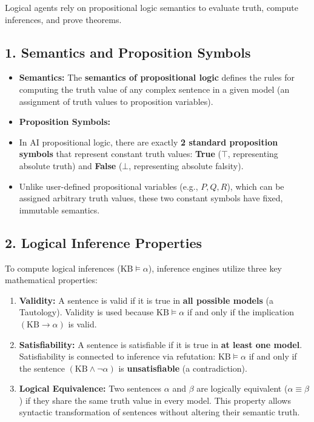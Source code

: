 Logical agents rely on propositional logic semantics to evaluate truth, compute inferences, and prove theorems.


\subsection{1. Semantics and Proposition Symbols}
\begin{itemize}
  \item   \textbf{Semantics:} The \textbf{semantics of propositional logic} defines the rules for computing the truth value of any complex sentence in a given model (an assignment of truth values to proposition variables).
  \item   \textbf{Proposition Symbols:}
  \item   In AI propositional logic, there are exactly \textbf{2 standard proposition symbols} that represent constant truth values: \textbf{True} ($\top$, representing absolute truth) and \textbf{False} ($\bot$, representing absolute falsity).
  \item   Unlike user-defined propositional variables (e.g., $P, Q, R$), which can be assigned arbitrary truth values, these two constant symbols have fixed, immutable semantics.
\end{itemize}

\subsection{2. Logical Inference Properties}
To compute logical inferences ($\text{KB} \models \alpha$), inference engines utilize three key mathematical properties:
\begin{enumerate}
  \item \textbf{Validity:} A sentence is valid if it is true in \textbf{all possible models} (a Tautology). Validity is used because $\text{KB} \models \alpha$ if and only if the implication $(\text{KB} \rightarrow \alpha)$ is valid.
  \item \textbf{Satisfiability:} A sentence is satisfiable if it is true in \textbf{at least one model}. Satisfiability is connected to inference via refutation: $\text{KB} \models \alpha$ if and only if the sentence $(\text{KB} \land \neg \alpha)$ is \textbf{unsatisfiable} (a contradiction).
  \item \textbf{Logical Equivalence:} Two sentences $\alpha$ and $\beta$ are logically equivalent ($\alpha \equiv \beta$) if they share the same truth value in every model. This property allows syntactic transformation of sentences without altering their semantic truth.
\end{enumerate}

